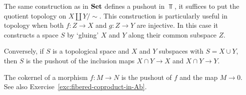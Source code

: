 \begin{example}[gluing]
The same construction as in $\mathbf{Set}$ defines a pushout in $\Top$, it suffices to put the quotient topology on $X\amalg Y/\sim$.  This construction is particularly useful in topology when both $f\colon Z\to X$ and $g\colon Z\to Y$ are injective. In this case it constructs a space $S$ by `gluing' $X$ and $Y$ along their common subspace $Z$. 

Conversely, if $S$ is a topological space and $X$ and $Y$ subspaces with $S = X \cup Y$, then $S$ is the pushout of the inclusion maps $X\cap Y \to X$ and $X\cap Y \to Y$.
\end{example}

\begin{example}The cokernel of a morphism $f\colon M\to N$ is the pushout of $f$ and the map $M\to 0$. See also Exercise~\ref{exc:fibered-coproduct-in-Ab}.
\end{example}

